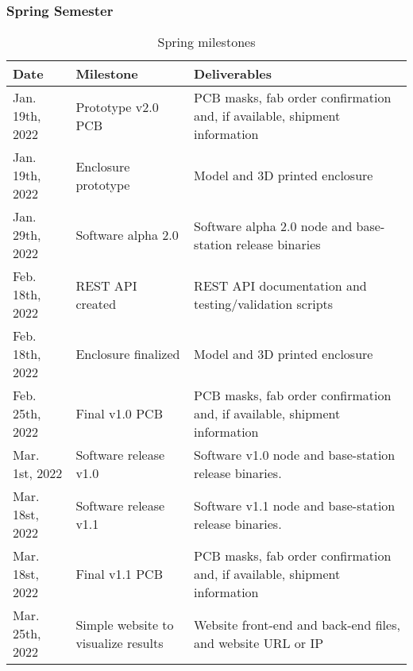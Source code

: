 \subsubsection{Spring Semester}
\begin{table}[H]
    \begin{tabularx}{\linewidth}{|X|X|X|}
        \hline
        Date & Milestone & Deliverables \\
        \hline\hline
        Jan. 19th, 2022 
        & Prototype v2.0 PCB 
        & PCB masks, fab order confirmation and, if available, shipment information \\
        
        \hline
        Jan. 19th, 2022
        & Enclosure prototype
        & Model and 3D printed enclosure
        \\
        
        \hline
        Jan. 29th, 2022 
        & Software alpha 2.0 
        & Software alpha 2.0 node and base-station release binaries
        \\
        
        \hline
        Feb. 18th, 2022
        & REST API created
        & REST API documentation and testing/validation scripts
        \\
        
        \hline
        Feb. 18th, 2022
        & Enclosure finalized
        & Model and 3D printed enclosure
        \\
        
        \hline
        Feb. 25th, 2022
        & Final v1.0 PCB
        & PCB masks, fab order confirmation and, if available, shipment information 
        \\
        
        \hline
        Mar. 1st, 2022
        & Software release v1.0
        & Software v1.0 node and base-station release binaries. 
        \\ 
        
        \hline
        Mar. 18st, 2022
        & Software release v1.1
        & Software v1.1 node and base-station release binaries. 
        \\ 
        
        \hline
        Mar. 18st, 2022
        & Final v1.1 PCB
        & PCB masks, fab order confirmation and, if available, shipment information 
        \\
        
        \hline
        Mar. 25th, 2022
        & Simple website to visualize results
        & Website front-end and back-end files, and website URL or IP
        \\
        
        \hline
    \end{tabularx}
    \caption{Spring milestones}
    \label{spring-milestones}
\end{table}



